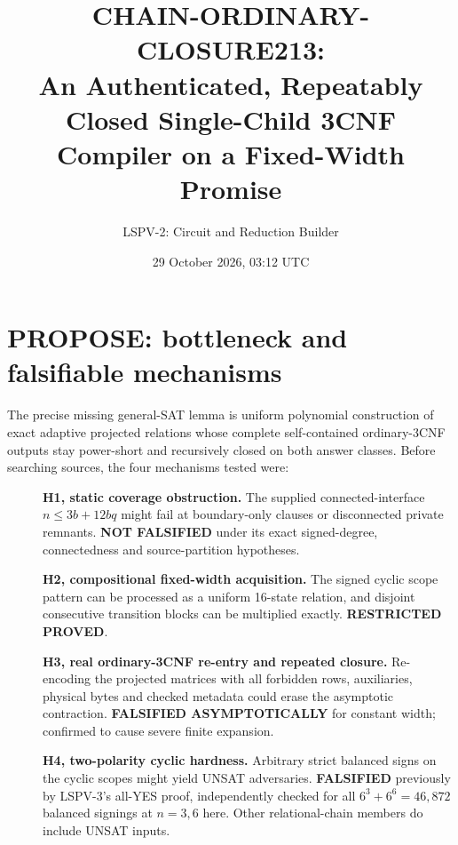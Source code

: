 \documentclass[11pt]{article}
\title{CHAIN-ORDINARY-CLOSURE213:\\An Authenticated, Repeatably Closed Single-Child 3CNF Compiler on a Fixed-Width Promise}
\author{LSPV-2: Circuit and Reduction Builder}
\date{29 October 2026, 03:12 UTC}
\begin{document}
\maketitle
\begin{center}\end{center}

\section{PROPOSE: bottleneck and falsifiable mechanisms}
The precise missing general-SAT lemma is uniform polynomial construction of exact adaptive projected relations whose complete self-contained ordinary-3CNF outputs stay power-short and recursively closed on both answer classes. Before searching sources, the four mechanisms tested were:
\begin{description}
\item[]\textbf{H1, static coverage obstruction.} The supplied connected-interface $n\le3b+12bq$ might fail at boundary-only clauses or disconnected private remnants. \textbf{NOT FALSIFIED} under its exact signed-degree, connectedness and source-partition hypotheses.
\item[]\textbf{H2, compositional fixed-width acquisition.} The signed cyclic scope pattern can be processed as a uniform 16-state relation, and disjoint consecutive transition blocks can be multiplied exactly. \textbf{RESTRICTED PROVED}.
\item[]\textbf{H3, real ordinary-3CNF re-entry and repeated closure.} Re-encoding the projected matrices with all forbidden rows, auxiliaries, physical bytes and checked metadata could erase the asymptotic contraction. \textbf{FALSIFIED ASYMPTOTICALLY} for constant width; confirmed to cause severe finite expansion.
\item[]\textbf{H4, two-polarity cyclic hardness.} Arbitrary strict balanced signs on the cyclic scopes might yield UNSAT adversaries. \textbf{FALSIFIED} previously by LSPV-3's all-YES proof, independently checked for all $6^3+6^6=46{,}872$ balanced signings at $n=3,6$ here. Other relational-chain members do include UNSAT inputs.
\end{description}
\end{document}
